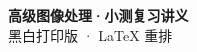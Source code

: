 \documentclass[10pt,a4paper]{article}
\begin{document}
\begin{center}{\LARGE\bfseries 高级图像处理·小测复习讲义}\\[4pt]{\large 黑白打印版 · LaTeX 重排}\end{center}
\vspace{3mm}



\end{document}
